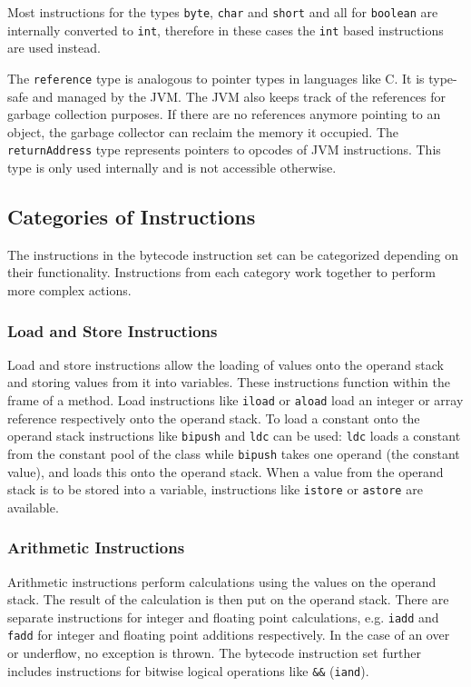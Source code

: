Most instructions for the types \texttt{byte}, \texttt{char} and \texttt{short} and all for \texttt{boolean} are internally converted to \texttt{int}, therefore in these cases the \texttt{int} based instructions are used instead.

The \texttt{reference} type is analogous to pointer types in languages like C. It is type-safe and managed by the JVM. The JVM also keeps track of the references for garbage collection purposes. If there are no references anymore pointing to an object, the garbage collector can reclaim the memory it occupied. The \texttt{returnAddress} type represents pointers to opcodes of JVM instructions. This type is only used internally and is not accessible otherwise.


\subsection{Categories of Instructions}

The instructions in the bytecode instruction set can be categorized depending on their functionality. Instructions from each category work together to perform more complex actions. 

\subsubsection{Load and Store Instructions}

Load and store instructions allow the loading of values onto the operand stack and storing values from it into variables. These instructions function within the frame of a method. Load instructions like \texttt{iload} or \texttt{aload} load an integer or array reference respectively onto the operand stack. To load a constant onto the operand stack instructions like \texttt{bipush} and \texttt{ldc} can be used: \texttt{ldc} loads a constant from the constant pool of the class while \texttt{bipush} takes one operand (the constant value), and loads this onto the operand stack. When a value from the operand stack is to be stored into a variable, instructions like \texttt{istore} or \texttt{astore} are available. 

\subsubsection{Arithmetic Instructions}

Arithmetic instructions perform calculations using the values on the operand stack. The result of the calculation is then put on the operand stack. There are separate instructions for integer and floating point calculations, e.g. \texttt{iadd} and \texttt{fadd} for integer and floating point additions respectively. In the case of an over or underflow, no exception is thrown. The bytecode instruction set further includes instructions for bitwise logical operations like \verb|&&| (\texttt{iand}). 


